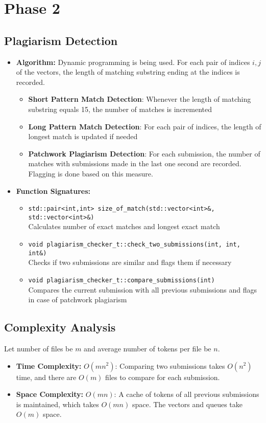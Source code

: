 \documentclass[12pt]{article}
\begin{document}
\section{Phase 2}

\subsection{Plagiarism Detection}
\begin{itemize}[noitemsep]
    \item \textbf{Algorithm:} Dynamic programming is being used. For each pair of indices $i, j$ of the vectors, the length of matching substring ending at the indices is recorded.
    \begin{itemize}
        \item \textbf{Short Pattern Match Detection}: Whenever the length of matching substring equals 15, the number of matches is incremented
        \item \textbf{Long Pattern Match Detection}: For each pair of indices, the length of longest match is updated if needed
        \item \textbf{Patchwork Plagiarism Detection}: For each submission, the number of matches with submissions made in the last one second are recorded. Flagging is done based on this measure.
    \end{itemize}
    \item \textbf{Function Signatures:}
    \begin{itemize}
        \item \texttt{std::pair<int,int> size\_of\_match(std::vector<int>\&, std::vector<int>\&)} \\
        Calculates number of exact matches and longest exact match
        \item \texttt{void plagiarism\_checker\_t::check\_two\_submissions(int, int, int\&)} \\
        Checks if two submissions are similar and flags them if necessary
        \item \texttt{void plagiarism\_checker\_t::compare\_submissions(int)} \\
        Compares the current submission with all previous submissions and flags in case of patchwork plagiarism
    \end{itemize}
\end{itemize}

\subsection{Complexity Analysis}
Let number of files be $m$ and average number of tokens per file be $n$.
\begin{itemize}[noitemsep]
    \item \textbf{Time Complexity:} $O(mn^2)$: Comparing two submissions takes $O(n^2)$ time, and there are $O(m)$ files to compare for each submission.
    \item \textbf{Space Complexity:} $O(mn)$: A cache of tokens of all previous submissions is maintained, which takes $O(mn)$ space. The vectors and queues take $O(m)$ space.
\end{itemize}
\end{document}
